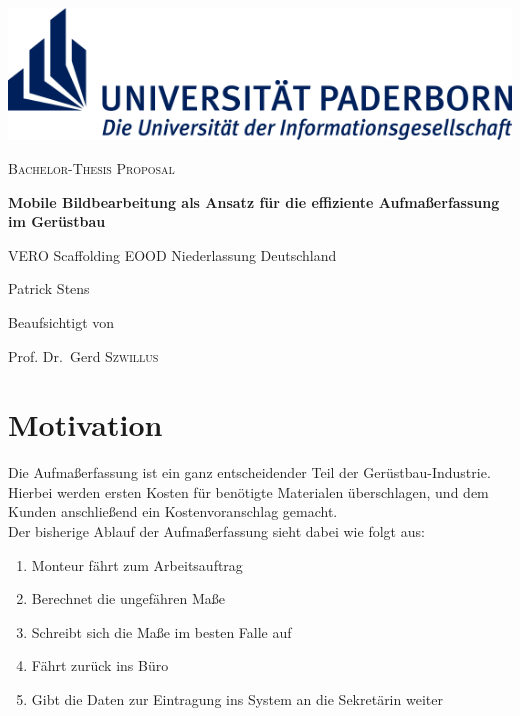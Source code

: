 \documentclass[a4paper]{article}
\begin{document}
\renewcommand{\refname}{Literatur}

\begin{titlepage}
	\centering
	\includegraphics[width=\textwidth]{logo}
	\par\vspace{5cm}

	{\scshape\Large Bachelor-Thesis Proposal\par}
	\vspace{1cm}

	{\huge\bfseries Mobile Bildbearbeitung als Ansatz für die effiziente Aufmaßerfassung im Gerüstbau\par}
	\vspace{2cm}

	{\large VERO Scaffolding EOOD Niederlassung Deutschland\par}

	{\Large Patrick Stens\par}

	\vfill

	Beaufsichtigt von\par
	Prof. Dr.~Gerd \textsc{Szwillus}	

\end{titlepage}

\section{Motivation}
Die Aufmaßerfassung ist ein ganz entscheidender Teil der Gerüstbau-Industrie. 
Hierbei werden ersten Kosten für benötigte Materialen überschlagen, und dem Kunden anschließend ein Kostenvoranschlag gemacht. \\ 
Der bisherige Ablauf der Aufmaßerfassung sieht dabei wie folgt aus:
\begin{enumerate}
	\item Monteur fährt zum Arbeitsauftrag 
	\item Berechnet die ungefähren Maße
	\item Schreibt sich die Maße im besten Falle auf
	\item Fährt zurück ins Büro
	\item Gibt die Daten zur Eintragung ins System an die Sekretärin weiter
\end{enumerate}
\end{document}
